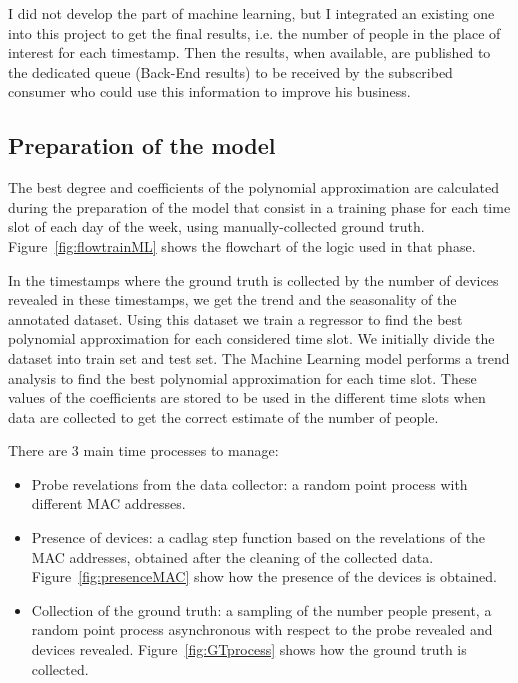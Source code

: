 I did not develop the part of machine learning, but I integrated an existing one into this project to get the final results, i.e. the number of people in the place of interest for each timestamp. Then the results, when available, are published to the dedicated queue (Back-End results) to be received by the subscribed consumer who could use this information to improve his business.


\vspace{0.1 cm}
\subsection{Preparation of the model}
\label{sec:model}
\vspace{0.1 cm} 

The best degree and coefficients of the polynomial approximation are calculated during the preparation of the model that consist in a training phase for each time slot of each day of the week, using manually-collected ground truth. Figure~\ref{fig:flowtrainML} shows the flowchart of the logic used in that phase.

In the timestamps where the ground truth is collected by the number of devices revealed in these timestamps, we get the trend and the seasonality of the annotated dataset.
Using this dataset we train a regressor to find the best polynomial approximation for each considered time slot. We initially divide the dataset into train set and test set. The Machine Learning model performs a trend analysis to find the best polynomial approximation for each time slot. These values of the coefficients are stored to be used in the different time slots when data are collected to get the correct estimate of the number of people.

There are 3 main time processes to manage:
\begin{itemize}
  \item Probe revelations from the data collector: a random point process with different MAC addresses.
  \item Presence of devices: a cadlag step function based on the revelations of the MAC addresses, obtained after the cleaning of the collected data. Figure~\ref{fig:presenceMAC} show how the presence of the devices is obtained.
  \item Collection of the ground truth: a sampling of the number people present, a random point process asynchronous with respect to the probe revealed and devices revealed. Figure~\ref{fig:GTprocess} shows how the ground truth is collected.
\end{itemize}


